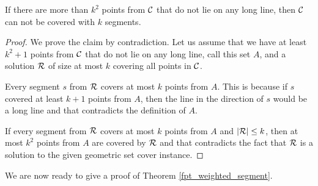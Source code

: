 \begin{claim}
\label{few_points}
If there are more than $k^2$ points from $\mathcal{C}$
that do not lie on any long line,
then $\mathcal{C}$ can not be covered with $k$ segments.
\end{claim}

\begin{proof}
We prove the claim by contradiction.
Let us assume that we have at least $k^2+1$ points
from $\mathcal{C}$ that do not lie on any long line, call this set $A$,
and a solution $\mathcal{R}$ of size at most $k$
covering all points in $\mathcal{C}$.

Every segment $s$ from $\mathcal{R}$ covers at most $k$
points from $A$.
This is because if $s$ covered at least $k+1$ points from $A$,
then the line in the direction of $s$ would be a long line
and that contradicts the definition of $A$.

If every segment from $\mathcal{R}$ covers at most $k$ points from $A$
and $|\mathcal{R}| \le k$, then at most $k^2$ points from $A$ are covered by $\mathcal{R}$
and that contradicts the fact that $\mathcal{R}$ is a solution to the given
geometric set cover instance.
\end{proof}

We are now ready to give a proof of Theorem \ref{fpt_weighted_segment}.

\newcommand{\instance}{(\points,\sets)}
\newcommand{\instancePrim}{(\points',\sets')}

